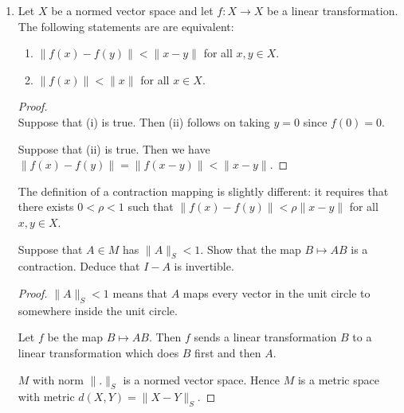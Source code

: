 \documentclass[12pt]{article}
\begin{document}
\begin{enumerate}
\begin{proof}
\begin{enumerate}
      So yeah, the triangle inequality has to hold. On the left the {\it same} vector is
      transformed by $A$ and $B$, and we take the sup over all possible choices of that vector. On
      the right we get to choose different vectors for the $A$ and $B$ transformation, so we can't
      possibly do worse.

    \end{enumerate}
  \end{proof}
\item
  \begin{lemma*}
    Let $X$ be a normed vector space and let $f:X \to X$ be a linear transformation. The following
    statements are are equivalent:
    \begin{enumerate}[label=(\roman*)]
    \item $\|f(x) - f(y)\| < \|x - y\|$ for all $x, y \in X$.
    \item $\|f(x)\| < \|x\|$ for all $x \in X$.
    \end{enumerate}
  \end{lemma*}
  \begin{proof}~\\
    Suppose that (i) is true. Then (ii) follows on taking $y = 0$ since $f(0) = 0$.

    Suppose that (ii) is true. Then we have $\|f(x) - f(y)\| = \|f(x - y)\| < \|x - y\|$.
  \end{proof}
  \begin{remark*}
    The definition of a contraction mapping is slightly different: it requires that there exists
    $0 < \rho < 1$ such that $\|f(x) - f(y)\| < \rho\|x - y\|$ for all $x, y \in X$.
  \end{remark*}


  \begin{claim*}
    Suppose that $A \in M$ has $\|A\|_S < 1$. Show that the map $B \mapsto AB$ is a
    contraction. Deduce that $I - A$ is invertible.
  \end{claim*}
  \begin{proof}
    $\|A\|_S < 1$ means that $A$ maps every vector in the unit circle to somewhere inside the unit
    circle.

    Let $f$ be the map $B \mapsto AB$. Then $f$ sends a linear transformation $B$ to a linear
    transformation which does $B$ first and then $A$.

    $M$ with norm $\|.\|_S$ is a normed vector space. Hence $M$ is a metric space with metric
    $d(X, Y) = \|X - Y\|_S$.


\end{proof}
\end{enumerate}
\end{document}
